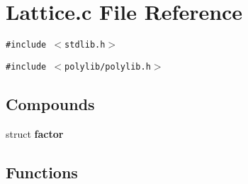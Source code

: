 \section{Lattice.c File Reference}
\label{Lattice_8c}
{\tt \#include $<$stdlib.h$>$}\par
{\tt \#include $<$polylib/polylib.h$>$}\par
\subsection*{Compounds}
\begin{CompactItemize}
\item 
struct {\bf factor}
\end{CompactItemize}
\subsection*{Functions}
